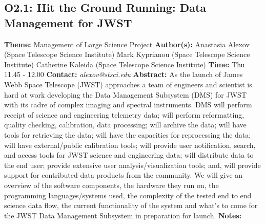 \documentclass{report}
\begin{document}
{{{{\subsection*{O2.1: Hit the Ground Running: Data Management for JWST}
{\bf Theme:}  Management of Large Science Project\newline
{\bf Author(s):}\newline
Anastasia Alexov (Space Telescope Science Institute) \newline Mark Kyprianou (Space Telescope Science Institute) \newline  Catherine Kaleida (Space Telescope Science Institute)\newline   \newline  \newline  \newline\newline
{\bf Time:} Thu 11.45 - 12.00\newline
\newline
{\bf Contact:} {\it alexov@stsci.edu}\newline
\newline\newline
{\bf Abstract:}\newline
As the launch of James Webb Space Telescope (JWST) approaches a team of engineers and scientist is hard at work developing the Data Management Subsystem (DMS) for JWST with its cadre of complex imaging and spectral instruments.  DMS will perform receipt of science and engineering telemetry data; will perform reformatting, quality checking, calibration, data processing; will archive the data; will have tools for retrieving the data;  will have the capacities for reprocessing the data; will have external/public calibration tools; will provide user notification, search, and access tools for JWST science and engineering data;  will distribute data to the end user; provide extensive user analysis/visualization tools; and, will provide support for contributed data products from the community. We will give an overview of the software components, the hardware they run on, the programming languages/systems used, the complexity of the tested end to end science data flow, the current functionality of the system and what's to come for the JWST Data Management Subsystem in preparation for launch.\newline
{\bf Notes:}\newline
{\newpage
}}}}}
\end{document}
